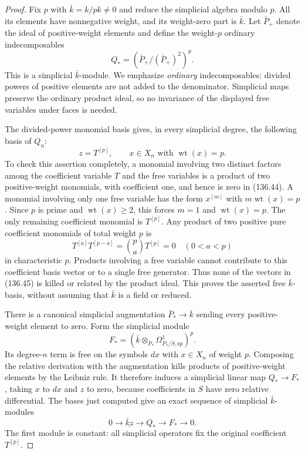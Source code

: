 \documentclass[11pt,a4paper]{article}
\theoremstyle{definition}\newtheorem{definition}[theorem]{Definition}
\theoremstyle{remark}\newtheorem{remark}[theorem]{Remark}
\begin{document}
\begin{proof}
Fix $p$ with $\bar k=k/pk\ne0$ and reduce the
simplicial algebra modulo $p$.  All its elements
have nonnegative weight, and its weight-zero part
is $\bar k$.  Let $\bar P_+$ denote the ideal of
positive-weight elements and define the weight-$p$
ordinary indecomposables
\[
                  Q_*=(\bar P_+/(\bar P_+)^2)^p.
                                                               \tag{136.44}
\]
This is a simplicial $\bar k$-module.  We emphasize
\emph{ordinary} indecomposables: divided powers of
positive elements are not added to the denominator.
Simplicial maps preserve the ordinary product ideal,
so no invariance of the displayed free variables
under faces is needed.

The divided-power monomial basis gives, in every
simplicial degree, the following basis of $Q_n$:
\[
       z=T^{[p]},\qquad x\in X_n\text{ with }
                                      \operatorname{wt}(x)=p.
                                                               \tag{136.45}
\]
To check this assertion completely, a monomial
involving two distinct factors among the coefficient
variable $T$ and the free variables is a product of
two positive-weight monomials, with coefficient one,
and hence is zero in (136.44).  A monomial involving
only one free variable has the form $x^{[m]}$ with
$m\operatorname{wt}(x)=p$.  Since $p$ is prime and
$\operatorname{wt}(x)\geq2$, this forces $m=1$
and $\operatorname{wt}(x)=p$.  The only remaining
coefficient monomial is $T^{[p]}$.  Any product
of two positive pure coefficient monomials of
total weight $p$ is
\[
           T^{[a]}T^{[p-a]}=\binom pa T^{[p]}=0
                    \quad(0<a<p)                         \tag{136.46}
\]
in characteristic $p$.  Products involving a free
variable cannot contribute to this coefficient
basis vector or to a single free generator.
Thus none of the vectors in (136.45) is killed or
related by the product ideal.  This proves the
asserted free $\bar k$-basis, without assuming that
$\bar k$ is a field or reduced.

There is a canonical simplicial augmentation
$\bar P_*\to\bar k$ sending every positive-weight
element to zero.  Form the simplicial module
\[
 F_*=
 \left(\bar k\otimes_{\bar P_*}
              \Omega^1_{\bar P_*/\bar S,\mathrm{sp}}\right)^p.
                                                               \tag{136.47}
\]
Its degree-$n$ term is free on the symbols $dx$
with $x\in X_n$ of weight $p$.  Composing the
relative derivation with the augmentation kills
products of positive-weight elements by the
Leibniz rule.  It therefore induces a simplicial
linear map $Q_*\to F_*$, taking $x$ to $dx$ and
$z$ to zero, because coefficients in $S$ have
zero relative differential.  The bases just
computed give an exact sequence of simplicial
$\bar k$-modules
\[
 0\longrightarrow\underline{\bar k z}
       \longrightarrow Q_*
       \longrightarrow F_*\longrightarrow0.              \tag{136.48}
\]
The first module is constant: all simplicial
operators fix the original coefficient $T^{[p]}$.


\end{proof}
\end{document}
